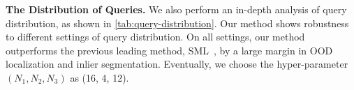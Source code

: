 \documentclass[10pt,twocolumn,letterpaper]{article}
\begin{document}
{\bf The Distribution of Queries.} We also perform an in-depth analysis of query distribution, as shown in \cref{tab:query-distribution}. Our method shows robustness to different settings of query distribution. On all settings, our method outperforms the previous leading method, SML~\cite{jung2021standardized}, by a large margin in OOD localization and inlier segmentation. Eventually, we choose the hyper-parameter $(N_1, N_2, N_3)$ as (16, 4, 12).

\begin{table}[t]
\centering
{}
\caption{Ablation study on the distribution of queries. ($\mathrm{DSC}_{\mathrm{inlier}}$: mean Dice Score of inlier tumors.)}
\label{tab:query-distribution}
\end{table}
\end{document}
